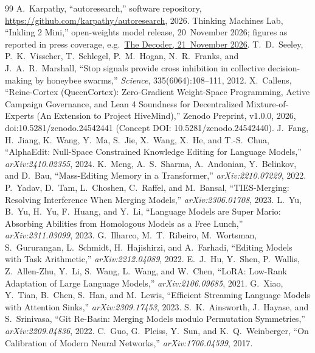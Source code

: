 \documentclass[11pt,a4paper]{article}
\begin{document}
\begin{thebibliography}{99}
 A.~Karpathy, ``autoresearch,'' software repository, \url{https://github.com/karpathy/autoresearch}, 2026.
 Thinking Machines Lab, ``Inkling 2 Mini,'' open-weights model release, 20~November 2026; figures as reported in press coverage, e.g.\ \href{https://the-decoder.com/new-open-model-inkling-2-mini-thinks-in-loops-to-solve-problems-with-fewer-words-and-still-runs-on-a-laptop/}{The Decoder, 21~November 2026}.
 T.~D.~Seeley, P.~K.~Visscher, T.~Schlegel, P.~M.~Hogan, N.~R.~Franks, and J.~A.~R.~Marshall, ``Stop signals provide cross inhibition in collective decision-making by honeybee swarms,'' \textit{Science}, 335(6064):108--111, 2012.
 X.~Callens, ``Reine-Cortex (QueenCortex): Zero-Gradient Weight-Space Programming, Active Campaign Governance, and Lean 4 Soundness for Decentralized Mixture-of-Experts (An Extension to Project HiveMind),'' Zenodo Preprint, v1.0.0, 2026, doi:10.5281/zenodo.24542441 (Concept DOI: 10.5281/zenodo.24542440).
 J.~Fang, H.~Jiang, K.~Wang, Y.~Ma, S.~Jie, X.~Wang, X.~He, and T.-S.~Chua, ``AlphaEdit: Null-Space Constrained Knowledge Editing for Language Models,'' \textit{arXiv:2410.02355}, 2024.
 K.~Meng, A.~S.~Sharma, A.~Andonian, Y.~Belinkov, and D.~Bau, ``Mass-Editing Memory in a Transformer,'' \textit{arXiv:2210.07229}, 2022.
 P.~Yadav, D.~Tam, L.~Choshen, C.~Raffel, and M.~Bansal, ``TIES-Merging: Resolving Interference When Merging Models,'' \textit{arXiv:2306.01708}, 2023.
 L.~Yu, B.~Yu, H.~Yu, F.~Huang, and Y.~Li, ``Language Models are Super Mario: Absorbing Abilities from Homologous Models as a Free Lunch,'' \textit{arXiv:2311.03099}, 2023.
 G.~Ilharco, M.~T.~Ribeiro, M.~Wortsman, S.~Gururangan, L.~Schmidt, H.~Hajishirzi, and A.~Farhadi, ``Editing Models with Task Arithmetic,'' \textit{arXiv:2212.04089}, 2022.
 E.~J.~Hu, Y.~Shen, P.~Wallis, Z.~Allen-Zhu, Y.~Li, S.~Wang, L.~Wang, and W.~Chen, ``LoRA: Low-Rank Adaptation of Large Language Models,'' \textit{arXiv:2106.09685}, 2021.
 G.~Xiao, Y.~Tian, B.~Chen, S.~Han, and M.~Lewis, ``Efficient Streaming Language Models with Attention Sinks,'' \textit{arXiv:2309.17453}, 2023.
 S.~K.~Ainsworth, J.~Hayase, and S.~Srinivasa, ``Git Re-Basin: Merging Models modulo Permutation Symmetries,'' \textit{arXiv:2209.04836}, 2022.
 C.~Guo, G.~Pleiss, Y.~Sun, and K.~Q.~Weinberger, ``On Calibration of Modern Neural Networks,'' \textit{arXiv:1706.04599}, 2017.
\end{thebibliography}
\end{document}
